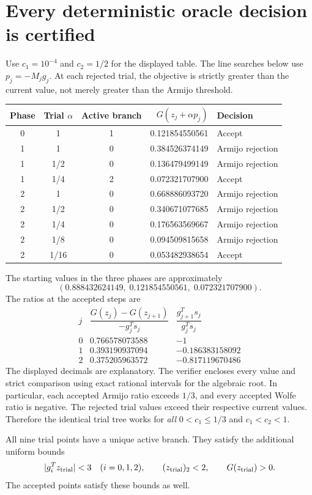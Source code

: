 \documentclass[10pt,oneside,openany]{book}
\theoremstyle{remark}\newtheorem{remark}{Remark}[chapter]
\begin{document}
\section{Every deterministic oracle decision is certified}
Use $c_1=10^{-4}$ and $c_2=1/2$ for the displayed table. The line searches below use $p_j=-M_jg_j$. At each rejected trial, the objective is strictly greater than the current value, not merely greater than the Armijo threshold.
\begin{center}\small
\begin{tabular}{cccrl}\toprule
Phase & Trial $\alpha$ & Active branch & $G(z_j+\alpha p_j)$ & Decision\\\midrule
0&1&1&0.121854550561&Accept\\\midrule
1&1&0&0.384526374149&Armijo rejection\\
1&1/2&0&0.136479499149&Armijo rejection\\
1&1/4&2&0.072321707900&Accept\\\midrule
2&1&0&0.668886093720&Armijo rejection\\
2&1/2&0&0.340671077685&Armijo rejection\\
2&1/4&0&0.176563569667&Armijo rejection\\
2&1/8&0&0.094509815658&Armijo rejection\\
2&1/16&0&0.053482938654&Accept\\\bottomrule
\end{tabular}
\end{center}
The starting values in the three phases are approximately
\[
 (0.888432624149,\;0.121854550561,\;0.072321707900).
\]
The ratios at the accepted steps are
\[
\begin{array}{c|rr}
 j & \dfrac{G(z_j)-G(z_{j+1})}{-g_j^Ts_j}
 &\dfrac{g_{j+1}^Ts_j}{g_j^Ts_j}\\\hline
0&0.766578073588&-1\\
1&0.393190937094&-0.186383158092\\
2&0.375205963572&-0.817119670486
\end{array}
\]
The displayed decimals are explanatory. The verifier encloses every value and strict comparison using exact rational intervals for the algebraic root. In particular, each accepted Armijo ratio exceeds $1/3$, and every accepted Wolfe ratio is negative. The rejected trial values exceed their respective current values. Therefore the identical trial tree works for \emph{all} $0<c_1\le1/3$ and $c_1<c_2<1$.

All nine trial points have a unique active branch. They satisfy the additional uniform bounds
\begin{equation}\label{D:trialbounds}
 |g_i^Tz_{\rm trial}|<3\quad(i=0,1,2),
 \qquad (z_{\rm trial})_2<2,
 \qquad G(z_{\rm trial})>0.
\end{equation}
The accepted points satisfy these bounds as well.
\end{document}
